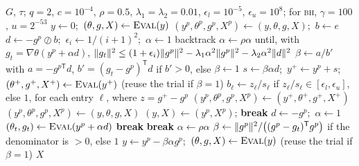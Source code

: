 \begin{algorithm}[H]
\caption{AGD-SDAJ~\cite{huynh2025accelerated} (AGD-SDAJ-BH: with the marked branch)}\label{alg:agd}
\begin{algorithmic}[1]
\Require $G$, $\tau$; $q=2$, $c=10^{-4}$, $\rho=0.5$, $\lambda_1=\lambda_2=0.01$, $\epsilon_l=10^{-5}$, $\epsilon_u=10^{8}$; for \textsc{bh}, $\gamma=100$, $u=2^{-53}$
\State $y\gets0$;\ $(\theta,g,X)\gets\textsc{Eval}(y)$
  \State $(y^{p},\theta^{p},g^{p},X^{p})\gets(y,\theta,g,X)$;\ $b\gets e$ 
   
    \State $d\gets-g^p\oslash b$;\ $\epsilon_i\gets1/(i+1)^2$;\ $\alpha\gets1$
    \State backtrack $\alpha\gets\rho\alpha$ until, with $g_t=\nabla\theta(y^p+\alpha d)$,
    \Statex \hspace{2\algorithmicindent}$\lVert g_t\rVert^2\le(1+\epsilon_i)\lVert g^p\rVert^2-\lambda_1\alpha^2\lVert g^p\rVert^2-\lambda_2\alpha^2\lVert d\rVert^2$ 
    \State $\beta\gets a/b'$ with $a=-g^{p\mathsf T}d$, $b'=(g_t-g^p)^{\mathsf T}d$ if $b'>0$, else $\beta\gets1$ 
    \State $s\gets\beta\alpha d$;\ $y^+\gets y^p+s$;\ $(\theta^+,g^+,X^+)\gets\textsc{Eval}(y^+)$ (reuse the trial if $\beta=1$)
    \State $b_\ell\gets z_\ell/s_\ell$ if $z_\ell/s_\ell\in[\epsilon_l,\epsilon_u]$, else $1$, for each entry $\ell$, where $z=g^+-g^p$
    \State $(y^p,\theta^p,g^p,X^p)\gets(y^+,\theta^+,g^+,X^+)$
  \EndFor
   $(y^p,\theta^p,g^p,X^p)\gets(y,\theta,g,X)$ \EndIf
   $(y,X)\gets(y^p,X^p)$; \textbf{break} 
  \EndIf
  \State $d\gets-g^p$;\ $\alpha\gets1$
  \Loop {}
    \State $(\theta_t,g_t)\gets\textsc{Eval}(y^p+\alpha d)$
     \textbf{break} \EndIf
     \textbf{break} \EndIf
    \State $\alpha\gets\rho\alpha$
  \EndLoop
  \State $\beta\gets\lVert g^p\rVert^2/\bigl((g^p-g_t)^{\mathsf T}g^p\bigr)$ if the denominator is $>0$, else $1$
  \State $y\gets y^p-\beta\alpha g^p$;\ $(\theta,g,X)\gets\textsc{Eval}(y)$ (reuse the trial if $\beta=1$)
\EndWhile
\State \Return $X$
\end{algorithmic}
\end{algorithm}

